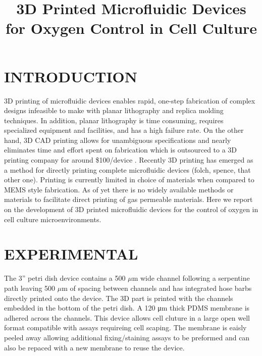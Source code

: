 \documentclass{article}
\title{3D Printed Microfluidic Devices for Oxygen Control in Cell Culture}
\begin{document}
\maketitle

\section{INTRODUCTION}

3D printing of microfluidic devices enables rapid, one-step fabrication of complex designs infeasible to make with planar lithography and replica molding techniques.
In addition, planar lithography is time consuming, requires specialized equipment and facilities, and has a high failure rate.
On the other hand, 3D CAD printing allows for unambiguous specifications and nearly eliminates time and effort spent on fabrication which is outsourced to a 3D printing company for around \$100/device \cite{Au2014,Chen2014}.
Recently 3D printing has emerged as a method for directly printing complete microfluidic devices (folch, spence, that other one). 
Printing is currently limited in choice of materials when compared to MEMS style fabrication. 
As of yet there is no widely available methods or materials to facilitate direct printing of gas permeable materials.
Here we report on the development of 3D printed microfluidic devices for the control of oxygen in cell culture microenvironments.


 

\section{EXPERIMENTAL}

The 3” petri dish device contains a 500 $\mu$m wide channel following a serpentine path leaving 500 $\mu$m of spacing between channels and has integrated hose barbs directly printed onto the device.
The 3D part is printed with the channels embedded in the bottom of the petri dish. 
A 120 μm thick PDMS membrane is adhered across the channels.
This device allows cell cluture in a large open well format compatible with assays requireing cell scaping.
The membrane is eaisly peeled away allowing additional fixing/staining assays to be preformed and can also be repaced with a new membrane to reuse the device. 
\end{document}
